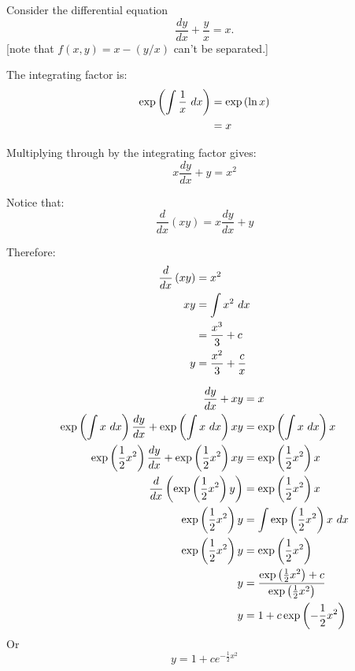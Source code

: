 \begin{example}
Consider the differential equation
\[\frac{dy}{dx}+\frac{y}{x}=x.\]
[note that $f(x,y)=x-(y/x)$ can't be separated.]

The integrating factor is:
\begin{align*}
\exp\left(\int\frac{1}{x}\ dx\right)
&=\exp\left(\ln x\right)\\
&=x
\end{align*}

Multiplying through by the integrating factor gives:
\[x\frac{dy}{dx}+y=x^2\]

Notice that: \[\frac{d}{dx}\left(xy\right) = x\frac{dy}{dx}+y\]

Therefore:
\begin{align*}
\frac{d}{dx}\left(xy\right) &= x^2\\
xy &= \int x^2\ dx\\
&= \frac{x^3}{3} +c\\
y &= \frac{x^2}{3} +\frac{c}{x}\\
\end{align*}

\end{example}

\begin{example}
\begin{align*}
\frac{dy}{dx}+xy&=x\\
\exp\left(\int x\ dx\right)\frac{dy}{dx}+\exp\left(\int x\ dx\right)xy&=\exp\left(\int x\ dx\right)x\\
\exp\left(\frac{1}{2}x^2\right)\frac{dy}{dx}+\exp\left(\frac{1}{2}x^2\right)xy&=\exp\left(\frac{1}{2}x^2\right)x\\
\frac{d}{dx}\left(\exp\left(\frac{1}{2}x^2\right)y\right)&=\exp\left(\frac{1}{2}x^2\right)x\\
\exp\left(\frac{1}{2}x^2\right)y&=\int \exp\left(\frac{1}{2}x^2\right)x\ dx\\
\exp\left(\frac{1}{2}x^2\right)y&=\exp\left(\frac{1}{2}x^2\right)\\
y&=\frac{\exp\left(\frac{1}{2}x^2\right)+c}{\exp\left(\frac{1}{2}x^2\right)}\\
y&=1+c\exp\left(-\frac{1}{2}x^2\right)
\end{align*}
Or
\[y = 1+c e^{-\frac{1}{2}x^2}\]
\end{example}

